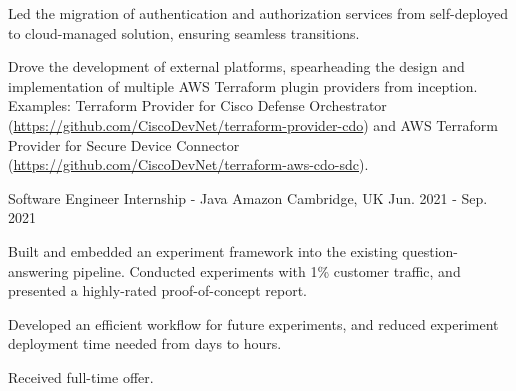 \begin{cventries}
{\begin{cvitems}
        \item {Led the migration of authentication and authorization services from self-deployed to cloud-managed solution, ensuring seamless transitions.}
        \item {Drove the development of external platforms, spearheading the design and implementation of multiple AWS Terraform plugin providers from inception. Examples: Terraform Provider for Cisco Defense Orchestrator (\href{https://github.com/CiscoDevNet/terraform-provider-cdo}{https://github.com/CiscoDevNet/terraform-provider-cdo}) and AWS Terraform Provider for Secure Device Connector (\href{https://github.com/CiscoDevNet/terraform-aws-cdo-sdc}{https://github.com/CiscoDevNet/terraform-aws-cdo-sdc}).}
    \end{cvitems}
    }

  \cventry
    {Software Engineer Internship - Java} %
    {Amazon} %
    {Cambridge, UK} %
    {Jun. 2021 - Sep. 2021} %
    {
      \begin{cvitems} %
        \item {Built and embedded an experiment framework into the existing question-answering pipeline. Conducted experiments with 1\% customer traffic, and presented a highly-rated proof-of-concept report.}
        \item {Developed an efficient workflow for future experiments, and reduced experiment deployment time needed from days to hours.}
        \item {Received full-time offer.}
      \end{cvitems}
    }


\end{cventries}
